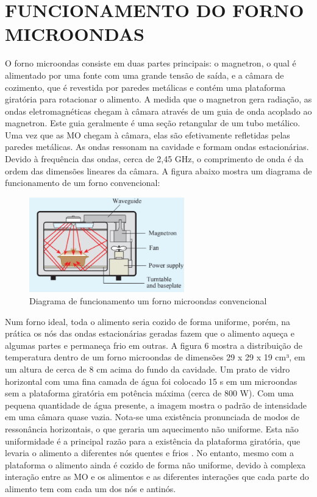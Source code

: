 \section{FUNCIONAMENTO DO FORNO MICROONDAS}
\label{sec:funcMicro}

O forno microondas consiste em duas partes principais: o magnetron, o qual é alimentado por uma fonte com uma grande tensão de saída, e a câmara de cozimento, que é revestida por paredes metálicas e contém uma plataforma giratória para rotacionar o alimento. A medida que o magnetron gera radiação, as ondas eletromagnéticas chegam à câmara através de um guia de onda acoplado ao magnetron. Este guia geralmente é uma seção retangular de um tubo metálico. Uma vez que as MO chegam à câmara, elas são efetivamente refletidas pelas paredes metálicas. As ondas ressonam na cavidade e formam ondas estacionárias. Devido à frequência das ondas, cerca de 2,45 GHz, o comprimento de onda é da ordem das dimensões lineares da câmara. A figura abaixo mostra um diagrama de funcionamento de um forno convencional:

\begin{figure}[!htb]
    \centering
    \includegraphics[width=0.6\textwidth]{./dados/figuras/microwave}
    \caption{Diagrama de funcionamento um forno microondas convencional}
    \label{fig:figura-fontferro}
\end{figure}

Num forno ideal, toda o alimento seria cozido de forma uniforme, porém, na prática os nós das ondas estacionárias geradas fazem que o alimento aqueça e algumas partes e permaneça frio em outras. A figura 6 mostra a distribuição de temperatura dentro de um forno microondas de dimensões  29 x 29 x 19 cm³, em um altura de cerca de 8 cm acima do fundo da cavidade. Um prato de vidro horizontal  com uma fina camada de água foi colocado 15 s em um microondas sem a plataforma giratória em potência máxima (cerca de 800 W). Com uma pequena quantidade de água presente, a imagem mostra o padrão de intensidade em uma câmara quase vazia. Nota-se uma existência pronunciada de modos de ressonância horizontais, o que geraria um aquecimento não uniforme. Esta não uniformidade é a principal razão para a existência da plataforma giratória, que levaria o alimento a diferentes nós quentes e frios \cite{Vollmer}. No entanto, mesmo com a plataforma o alimento ainda é cozido de forma não uniforme, devido à complexa interação entre as MO e os alimentos e as diferentes interações que cada parte do alimento tem com cada um dos nós e antinós.

